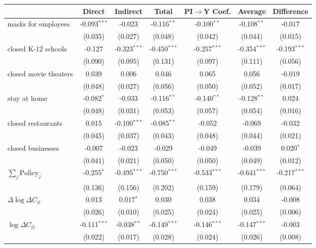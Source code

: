 
\begin{tabular}{lccccc|>{}c}
\toprule
  & Direct & Indirect & Total & PI$\to$Y Coef. & Average & Difference\\
\midrule
masks for employees & -0.093$^{***}$ & -0.023 & -0.116$^{**}$ & -0.100$^{**}$ & -0.108$^{**}$ & -0.017\\
 & (0.035) & (0.027) & (0.048) & (0.042) & (0.044) & (0.015)\\
closed K-12 schools & -0.127 & -0.323$^{***}$ & -0.450$^{***}$ & -0.257$^{***}$ & -0.354$^{***}$ & -0.193$^{***}$\\
 & (0.090) & (0.095) & (0.131) & (0.097) & (0.111) & (0.056)\\
closed movie theaters & 0.039 & 0.006 & 0.046 & 0.065 & 0.056 & -0.019\\
 & (0.048) & (0.027) & (0.056) & (0.050) & (0.052) & (0.017)\\
stay at home & -0.082$^{*}$ & -0.033 & -0.116$^{**}$ & -0.140$^{**}$ & -0.128$^{**}$ & 0.024\\
 & (0.048) & (0.031) & (0.053) & (0.057) & (0.054) & (0.016)\\
closed restaurants & 0.015 & -0.100$^{***}$ & -0.085$^{**}$ & -0.052 & -0.069 & -0.032\\
 & (0.045) & (0.037) & (0.043) & (0.048) & (0.044) & (0.021)\\
closed businesses & -0.007 & -0.023 & -0.029 & -0.049 & -0.039 & 0.020$^{*}$\\
 & (0.041) & (0.021) & (0.050) & (0.050) & (0.049) & (0.012)\\
$\sum_j \mathrm{Policy}_j$ & -0.255$^{*}$ & -0.495$^{***}$ & -0.750$^{***}$ & -0.533$^{***}$ & -0.641$^{***}$ & -0.217$^{***}$\\
 & (0.136) & (0.156) & (0.202) & (0.159) & (0.179) & (0.064)\\
$\Delta \log \Delta C_{it}$ & 0.013 & 0.017$^{*}$ & 0.030 & 0.038 & 0.034 & -0.008\\
 & (0.026) & (0.010) & (0.025) & (0.024) & (0.025) & (0.006)\\
$\log \Delta C_{it}$ & -0.111$^{***}$ & -0.038$^{**}$ & -0.149$^{***}$ & -0.146$^{***}$ & -0.147$^{***}$ & -0.003\\
 & (0.022) & (0.017) & (0.028) & (0.024) & (0.026) & (0.008)\\
\bottomrule
\end{tabular}